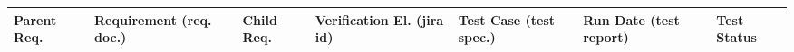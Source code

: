 \begin{longtable}[]{|p{1.5cm}|p{2.7cm}|p{1.5cm}|p{3.2cm}|p{1.5cm}|p{1.7cm}|p{1.5cm}|}
\hline
{\scriptsize \bf Parent Req.} &
\begin{minipage}[t]{0.9\columnwidth}
{\small \bf Requirement}\newline
{\scriptsize (req. doc.)}
\end{minipage} &
{\scriptsize \bf Child Req.} &
\begin{minipage}[t]{0.9\columnwidth}
{\small \bf Verification El.}\newline
{\scriptsize (jira id)}
\end{minipage}&
\begin{minipage}[t]{0.9\columnwidth}
{\small \bf Test Case}\newline
{\scriptsize (test spec.)}
\end{minipage} &
\begin{minipage}[t]{0.9\columnwidth}
{\small \bf Run Date}\newline
{\scriptsize (test report)}
\end{minipage} &
{\bf Test Status} \\ \hline


\end{longtable}
